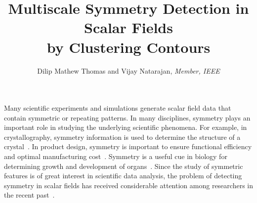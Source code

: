 \documentclass[review,journal]{vgtc}         %
\title{Multiscale Symmetry Detection in Scalar Fields\\
by Clustering Contours}
\author{Dilip Mathew Thomas and Vijay Natarajan, \textit{Member, IEEE}}
\begin{document}

\maketitle
Many scientific experiments and simulations generate scalar field data that
contain symmetric or repeating patterns. In many disciplines, 
symmetry plays an important role in studying the underlying scientific phenomena. 
For example, in crystallography, symmetry information is used to determine 
the structure of a crystal~\cite{som07}. In product design, symmetry is important 
to ensure functional efficiency and optimal manufacturing cost~\cite{booth02}. Symmetry is a 
useful cue in biology for determining growth and development of organs~\cite{stev06}. Since 
the study of symmetric features is of great interest in scientific data 
analysis, the problem of detecting symmetry in scalar fields has received 
considerable attention among researchers in the recent past~\cite{ThomN11,HongS08,kerbWKS11,ThomN13,MasoodTN13}.
\end{document}
